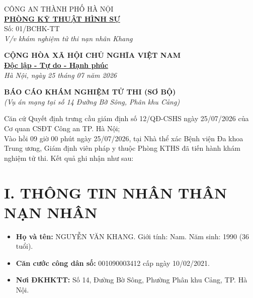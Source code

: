 \documentclass[12pt,a4paper]{article}
\begin{document}
\noindent
\begin{minipage}[t]{0.45\textwidth}
    \begin{center}
        \small
        CÔNG AN THÀNH PHỐ HÀ NỘI\\
        \textbf{\underline{PHÒNG KỸ THUẬT HÌNH SỰ}}\\[0.1cm]
        Số: 01/BCHK-TT\\
        \textit{V/v khám nghiệm tử thi nạn nhân Khang}
    \end{center}
\end{minipage}
\hfill
\begin{minipage}[t]{0.52\textwidth}
    \begin{center}
        \small
        \textbf{CỘNG HÒA XÃ HỘI CHỦ NGHĨA VIỆT NAM}\\
        \textbf{\underline{Độc lập - Tự do - Hạnh phúc}}\\[0.1cm]
        \textit{Hà Nội, ngày 25 tháng 07 năm 2026}
    \end{center}
\end{minipage}

\vspace{0.6cm}

\begin{center}
    \textbf{\large BÁO CÁO KHÁM NGHIỆM TỬ THI (SƠ BỘ)}\\
    \textit{(Vụ án mạng tại số 14 Đường Bờ Sông, Phân khu Cảng)}
\end{center}

\vspace{0.3cm}

\noindent Căn cứ Quyết định trưng cầu giám định số 12/QĐ-CSHS ngày 25/07/2026 của Cơ quan CSĐT Công an TP. Hà Nội;\\
Vào hồi 09 giờ 00 phút ngày 25/07/2026, tại Nhà thể xác Bệnh viện Đa khoa Trung ương, Giám định viên pháp y thuộc Phòng KTHS đã tiến hành khám nghiệm tử thi. Kết quả ghi nhận như sau:

\section*{I. THÔNG TIN NHÂN THÂN NẠN NHÂN}
\begin{itemize}[leftmargin=1.5cm]
    \item \textbf{Họ và tên:} NGUYỄN VĂN KHANG. Giới tính: Nam. Năm sinh: 1990 (36 tuổi).
    \item \textbf{Căn cước công dân số:} 001090003412 cấp ngày 10/02/2021.
    \item \textbf{Nơi ĐKHKTT:} Số 14, Đường Bờ Sông, Phường Phân khu Cảng, TP. Hà Nội.
\end{itemize}
\end{document}

